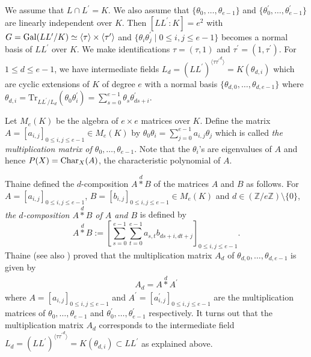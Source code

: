\documentclass[a4paper, 11pt]{amsart}
\newcommand{\Z}{\mathbb Z}
\theoremstyle{plain}
\theoremstyle{definition}
\numberwithin{equation}{section}
\begin{document}
We assume that $L \cap L^{\prime}= K$. 
We also 
assume that 
$\{\theta_0,\ldots,\theta_{e-1}\}$ 
and 
$\{\theta^{\prime}_0,\ldots,\theta^{\prime}_{e-1}\}$ 
are linearly independent over $K$. 
Then $[L L^{\prime}:K]=e^2$ with 
$G={\rm Gal}(L L^{\prime}/K)\simeq \langle \tau \rangle \times \langle \tau^{\prime} \rangle$ 
and $\{\theta_i\theta^{\prime}_j\mid 0\leq i,j\leq e-1\}$ 
becomes a normal basis of $L L^{\prime}$ over $K$. 
%
We make identifications $\tau = (\tau,1)$ 
and $\tau^{\prime} = (1, \tau^{\prime})$.  
For $1\leq d\leq e-1$, 
we have intermediate fields 
$L_d=(L L^{\prime})^{\langle \tau {\tau^{\prime}}^{d} \rangle}=K(\theta_{d,i})$ which are cyclic extensions of $K$ of degree $e$ 
with a normal basis $\{\theta_{d,0},\ldots,\theta_{d,e-1}\}$ 
where $\theta_{d,i} = \mathrm{Tr}_{L L^{\prime}/L_d}(\theta_0\theta^{\prime}_i)= \sum^{e-1}_{s=0}\theta_s \theta^{\prime}_{ds+i}$. 

Let $M_e(K)$ be the algebra of $e\times e$ matrices over $K$. 
Define the matrix $A=[a_{i,j}]_{0\leq i,j \leq e-1}\in M_e(K)$ 
by $\theta_0\theta_i=\sum^{e-1}_{j=0}a_{i,j}\theta_j$
which is called 
{\it the multiplication matrix of $\theta_0,\ldots,\theta_{e-1}$}. 
Note that the $\theta_i$'s are eigenvalues of $A$ and hence 
$P(X)={\rm Char}_X(A)$, the characteristic polynomial of $A$. 

Thaine \cite[Section 2]{Tha04} defined 
the $d$-composition $A\overset{d}{\ast}B$ 
of the matrices $A$ and $B$ as follows. 
For $A=[a_{i,j}]_{0\leq i,j\leq e-1}$, 
$B=[b_{i,j}]_{0\leq i,j\leq e-1}\in M_e(K)$ 
and $d\in(\Z/e\Z)\setminus\{0\}$, 
{\it the $d$-composition $A \overset{d}{\ast} B$ of $A$ and $B$} is defined by 
\[
A \overset{d}{\ast} B:= \left[\sum^{e-1}_{s=0}\sum^{e-1}_{t=0}a_{s,t}b_{ds+i,dt+j}\right]_{0\leq i,j\leq e-1}.
\]
Thaine \cite[Proposition~6]{Tha04} (see also \cite[Example 4]{Tha04}) 
proved that the multiplication matrix $A_d$ 
of $\theta_{d,0},\ldots,\theta_{d,e-1}$ is given by 
\begin{align*}
A_d=A\overset{d}{\ast}A^{\prime}
\end{align*}
where $A=[a_{i,j}]_{0\leq i,j\leq e-1}$ and 
$A^{\prime}=[a^{\prime}_{i,j}]_{0\leq i,j\leq e-1}$ are 
the multiplication matrices of 
$\theta_{0},\ldots,\theta_{e-1}$ 
and $\theta^{\prime}_{0},\ldots,\theta^{\prime}_{e-1}$ respectively.  
It turns out that 
the multiplication matrix $A_d$ corresponds to the intermediate field 
$L_d=(L L^{\prime})^{\langle \tau {\tau^{\prime}}^{d} \rangle}=K(\theta_{d,i}) 
\subset LL^{\prime}$ as explained above. 
\end{document}
